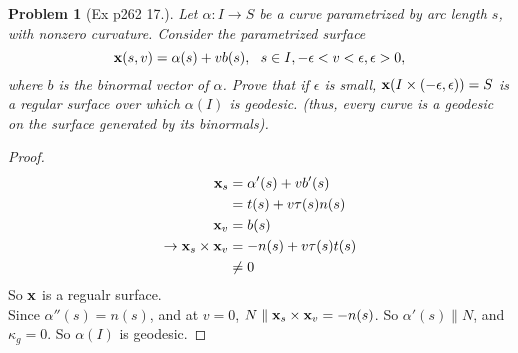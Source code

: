 \documentclass[10pt,a4paper]{article}
\newcounter{theProblemCounter}
\newtheorem{problem}[theProblemCounter]{Problem}
\begin{document}
\setcounter{theProblemCounter}{4}
\begin{problem}[Ex p262 17.]
Let $\alpha: I\to S$ be a curve parametrized by arc length $s$, with nonzero curvature. Consider the parametrized surface
\[ \mathbf{x}(s, v) = \alpha(s)+vb(s), \ \ s\in I, -\epsilon<v<\epsilon, \epsilon > 0,\]
where $b$ is the binormal vector of $\alpha$. Prove that if $\epsilon$ is small, $\mathbf{x}(I\times (-\epsilon, \epsilon)) = S$ is a regular surface over which $\alpha(I)$ is geodesic. (thus, every curve is a geodesic on the surface generated by its binormals).
\end{problem}
\begin{proof}
\begin{align*}
\mathbf{x}_s&=\alpha'(s)+vb'(s)\\
&=t(s)+v\tau(s)n(s)\\
\mathbf{x}_v&=b(s)\\
\rightarrow \mathbf{x}_s\times\mathbf{x}_v&=-n(s)+v\tau(s)t(s)\\
&\neq 0
\end{align*}
So $\mathbf{x}$ is a regualr surface.\\
Since $\alpha''(s)=n(s)$, and at $v=0$, $N\parallel \mathbf{x}_s\times\mathbf{x}_v=-n(s)$. So $\alpha'(s)\parallel N$, and $\kappa_g=0$. So $\alpha(I)$ is geodesic.
\end{proof}
\end{document}
